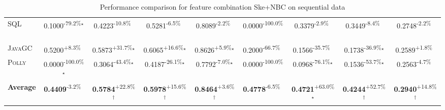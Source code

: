 \begin{table}[htbp]
\begin{tabular}{l|cccc|cccc}
\textsc{SQL} & \cellcolor{red!30}0.1000\textsuperscript{-79.2\%}$^\star$ & \cellcolor{red!30}0.4223\textsuperscript{-10.8\%}$^{\,\,\,}$ & \cellcolor{red!30}0.5281\textsuperscript{-6.5\%}$^{\,\,\,}$ & \cellcolor{red!30}0.8089\textsuperscript{-2.2\%}$^{\,\,\,}$ & \cellcolor{red!30}0.0000\textsuperscript{-100.0\%}$^{\,\,\,}$ & \cellcolor{red!30}0.3379\textsuperscript{-2.9\%}$^{\,\,\,}$ & \cellcolor{red!30}0.3449\textsuperscript{-8.4\%}$^{\,\,\,}$ & \cellcolor{red!30}0.2748\textsuperscript{-2.2\%}$^{\,\,\,}$ \\
\textsc{JavaGC} & \cellcolor{green!30}0.5200\textsuperscript{+8.3\%}$^{\,\,\,}$ & \cellcolor{green!30}0.5873\textsuperscript{+31.7\%}$^\star$ & \cellcolor{green!30}0.6065\textsuperscript{+16.6\%}$^\star$ & \cellcolor{green!30}0.8626\textsuperscript{+5.9\%}$^\star$ & \cellcolor{red!30}0.2000\textsuperscript{-66.7\%}$^{\,\,\,}$ & \cellcolor{red!30}0.1566\textsuperscript{-35.7\%}$^{\,\,\,}$ & \cellcolor{red!30}0.1738\textsuperscript{-36.9\%}$^\star$ & \cellcolor{green!30}0.2589\textsuperscript{+1.8\%}$^{\,\,\,}$ \\
\textsc{Polly} & \cellcolor{red!30}0.0000\textsuperscript{-100.0\%}$^\star$ & \cellcolor{red!30}0.3064\textsuperscript{-43.4\%}$^\star$ & \cellcolor{red!30}0.4187\textsuperscript{-26.1\%}$^\star$ & \cellcolor{red!30}0.7792\textsuperscript{-7.0\%}$^\star$ & \cellcolor{red!30}0.0000\textsuperscript{-100.0\%}$^{\,\,\,}$ & \cellcolor{red!30}0.0968\textsuperscript{-76.1\%}$^\star$ & \cellcolor{red!30}0.1536\textsuperscript{-53.7\%}$^\star$ & \cellcolor{red!30}0.2563\textsuperscript{-4.7\%}$^{\,\,\,}$ \\
\hline
\textbf{Average} & \cellcolor{red!30}\textbf{0.4409}\textsuperscript{-3.2\%}$^{\,\,\,}$ & \cellcolor{green!30}\textbf{0.5784}\textsuperscript{+22.8\%}$^\dagger$ & \cellcolor{green!30}\textbf{0.5978}\textsuperscript{+15.6\%}$^\dagger$ & \cellcolor{green!30}\textbf{0.8464}\textsuperscript{+3.6\%}$^\dagger$ & \cellcolor{red!30}\textbf{0.4778}\textsuperscript{-6.5\%}$^{\,\,\,}$ & \cellcolor{green!30}\textbf{0.4721}\textsuperscript{+63.0\%}$^\star$ & \cellcolor{green!30}\textbf{0.4244}\textsuperscript{+52.7\%}$^\dagger$ & \cellcolor{green!30}\textbf{0.2940}\textsuperscript{+14.8\%}$^\dagger$ \\
\hline
\end{tabular}
\caption{Performance comparison for feature combination Ske+NBC on sequential data}
\label{tab:combo_Ske_NBC_performance_sequential}
\end{table}